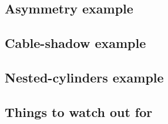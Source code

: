 \documentclass[green, 12pt]{beamer}
\begin{document}
\subsection{Asymmetry example}
  
  

\subsection{Cable-shadow example}
  
  

\subsection{Nested-cylinders example}
  

\subsection{Things to watch out for}
  

%  

%  
%  

%  

%  

%  

%  
%  
%  
\end{document}
